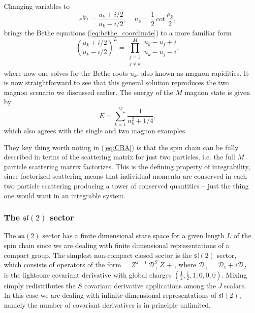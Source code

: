 Changing variables to
\begin{equation}
	e^{ip_k} = \frac{u_k + i/2}{u_k - i/2}, \;\;\;\; u_k = \frac{1}{2} \, \mathrm{cot} \, \frac{p_k}{2},
\end{equation}
brings the Bethe equations (\ref{eq:bethe_coordinate}) to a more familiar form
\begin{equation}
	\label{eq:su2_bae}
	\left( \frac{u_k + i/2}{u_k - i/2} \right)^L = \prod_{\substack{j=1 \\ j \neq k}}^M \frac{u_k - u_j + i}{u_k - u_j - i},
\end{equation}
where now one solves for the Bethe roots $u_k$, also known as magnon rapidities. 
It is now straightforward to see that this general solution reproduces the two magnon scenario we discussed earlier. 
The energy of the $M$ magnon state is given by
\begin{equation}
	E = \sum_{k=1}^M \frac{1}{u_k^2 + 1/4},
\end{equation}
 which also agrees with the single and two magnon examples. 
 
They key thing worth noting in (\ref{eq:CBA}) is that the spin chain can be fully described in terms of the scattering matrix for just two particles, i.e. the full $M$ particle scattering matrix factorizes.
This is the defining property of integrability, since factorized scattering means that individual momenta are conserved in each two particle scattering producing a tower of conserved quantities -- just the thing one would want in an integrable system. 
 
\subsubsection{The $\mathfrak{sl}(2)$ sector}

The $\mathfrak{su}(2)$ sector has a finite dimensional state space for a given length $L$ of the spin chain since we are dealing with finite dimensional representations of a compact group.
The simplest non-compact closed sector is the $\mathfrak{sl}(2)$ sector, which consists of operators of the form \cite{Beisert:2003yb}
\beq
	\label{eq:sl2_operators}
	 = \tr \( Z^{J-1} \, \mathcal{D}_+^S \, Z \) + ,
\eeq
where $\mathcal{D_+} = \mathcal{D}_1 + i \mathcal{D}_2$ is the lightcone covariant derivative with global charges $(\frac{1}{2},\frac{1}{2}, 1; 0,0,0)$. Mixing simply redistributes the $S$ covariant derivative applications among the $J$ scalars. In this case we are dealing with infinite dimensional representations of $\mathfrak{sl}(2)$, namely the number of covariant derivatives is in principle unlimited.

